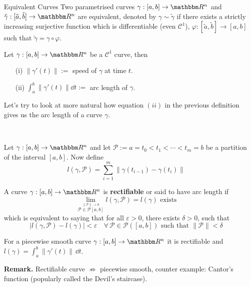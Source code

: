 \documentclass[../Analysis-3]{subfiles}
\begin{document}
\begin{Def}{Equivalent Curves}{}
    Two parametrised curves $\gamma : [a,b] \to \R^n$ and $\tilde{\gamma} : [\tilde{a}, \tilde{b}] \to \R^n$ are equivalent, denoted by $\gamma \sim \tilde{\gamma}$ if there exists a strictly increasing surjective function which is differentiable (even $\mathscr{C}^1$), $\varphi : [\tilde{a},\tilde{b}] \to [a,b]$ such that $\tilde{\gamma} = \gamma \circ \varphi$.
\end{Def}

\begin{Def}{}{}
    Let $\gamma : [a,b] \to \R^n$ be a $\mathscr{C}^1$ curve, then 
    \begin{enumerate}
        \item[(i)] $\| \gamma'(t) \| :=$ speed of $\gamma$ at time $t$. 
        \item[(ii)] $\int_a^b \| \gamma'(t) \| \dd t :=$ arc length of $\gamma$.    
    \end{enumerate}
\end{Def}

Let's try to look at more natural how equation $(ii)$ in the previous definition gives us the arc length of a curve $\gamma$. 

\ 

Let $\gamma : [a,b] \to \R^n$ and let $\mathcal{P} := a = t_0 < t_1 < \cdots < t_m = b $ be a partition of the interval $[a,b]$. Now define 
\[
    l(\gamma,\mathcal{P}) = \sum_{i=1}^m \| \gamma(t_{i-1}) - \gamma(t_i) \|     
\]

\begin{Def}{}{}
    A curve $\gamma : [a,b] \to \R^n$ is \textbf{rectifiable} or said to have arc length if 
    \[
        \lim_{\overset{\|\mathcal{P}\| \to 0}{\mathcal{P} \in \mathscr{P}[a,b]}} l(\gamma,\mathcal{P}) = l(\gamma) \mbox{ exists}    
    \]
    which is equivalent to saying that for all $\varepsilon > 0$, there exists $\delta >0$, such that 
    \[
        |l(\gamma,\mathcal{P}) - l(\gamma)| < \varepsilon \quad \forall \, \mathcal{P} \in \mathscr{P}([a,b]) \mbox{ such that } \| \mathcal{P} \| < \delta    
    \]
\end{Def}

\begin{Thm}{}{}\label{thm1:22}
    For a piecewise smooth curve $\gamma : [a,b] \to \R^n$ it is rectifiable and $l(\gamma) = \int_a^b \| \gamma'(t) \| \, \dd t $. 
\end{Thm}
\textbf{Remark.} Rectifiable curve $\not\Rightarrow$ piecewise smooth, counter example: Cantor's function (popularly called the Devil's staircase).  
\end{document}
